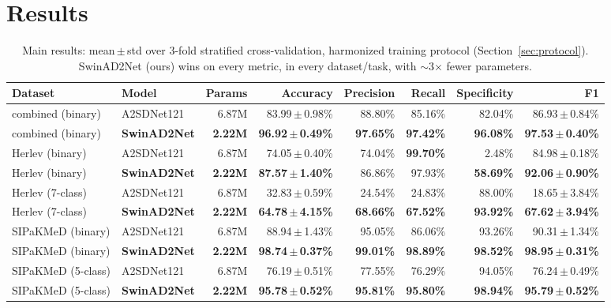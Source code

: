 \documentclass[10pt,twocolumn]{article}
\begin{document}
\section{Results}
\label{sec:results}

\begin{table}[t]
\centering\footnotesize
\begin{tabular}{@{}llrrrrrr@{}}
\toprule
\textbf{Dataset} & \textbf{Model} & \textbf{Params} & \textbf{Accuracy} & \textbf{Precision} & \textbf{Recall} & \textbf{Specificity} & \textbf{F1} \\
\midrule
combined (binary) & A2SDNet121 & 6.87M & 83.99\,$\pm$\,0.98\% & 88.80\% & 85.16\% & 82.04\% & 86.93\,$\pm$\,0.84\% \\
combined (binary) & \textbf{SwinAD2Net} & \textbf{2.22M} & \textbf{96.92\,$\pm$\,0.49\%} & \textbf{97.65\%} & \textbf{97.42\%} & \textbf{96.08\%} & \textbf{97.53\,$\pm$\,0.40\%} \\
\addlinespace
Herlev (binary) & A2SDNet121 & 6.87M & 74.05\,$\pm$\,0.40\% & 74.04\% & \textbf{99.70\%} & 2.48\% & 84.98\,$\pm$\,0.18\% \\
Herlev (binary) & \textbf{SwinAD2Net} & \textbf{2.22M} & \textbf{87.57\,$\pm$\,1.40\%} & 86.86\% & 97.93\% & \textbf{58.69\%} & \textbf{92.06\,$\pm$\,0.90\%} \\
\addlinespace
Herlev (7-class) & A2SDNet121 & 6.87M & 32.83\,$\pm$\,0.59\% & 24.54\% & 24.83\% & 88.00\% & 18.65\,$\pm$\,3.84\% \\
Herlev (7-class) & \textbf{SwinAD2Net} & \textbf{2.22M} & \textbf{64.78\,$\pm$\,4.15\%} & \textbf{68.66\%} & \textbf{67.52\%} & \textbf{93.92\%} & \textbf{67.62\,$\pm$\,3.94\%} \\
\addlinespace
SIPaKMeD (binary) & A2SDNet121 & 6.87M & 88.94\,$\pm$\,1.43\% & 95.05\% & 86.06\% & 93.26\% & 90.31\,$\pm$\,1.34\% \\
SIPaKMeD (binary) & \textbf{SwinAD2Net} & \textbf{2.22M} & \textbf{98.74\,$\pm$\,0.37\%} & \textbf{99.01\%} & \textbf{98.89\%} & \textbf{98.52\%} & \textbf{98.95\,$\pm$\,0.31\%} \\
\addlinespace
SIPaKMeD (5-class) & A2SDNet121 & 6.87M & 76.19\,$\pm$\,0.51\% & 77.55\% & 76.29\% & 94.05\% & 76.24\,$\pm$\,0.49\% \\
SIPaKMeD (5-class) & \textbf{SwinAD2Net} & \textbf{2.22M} & \textbf{95.78\,$\pm$\,0.52\%} & \textbf{95.81\%} & \textbf{95.80\%} & \textbf{98.94\%} & \textbf{95.79\,$\pm$\,0.52\%} \\
\bottomrule
\end{tabular}
\caption{Main results: mean\,$\pm$\,std over 3-fold stratified cross-validation, harmonized training protocol (Section~\ref{sec:protocol}). SwinAD2Net (ours) wins on every metric, in every dataset/task, with $\sim$3$\times$ fewer parameters.}
\label{tab:mainresults}
\end{table}
\end{document}
